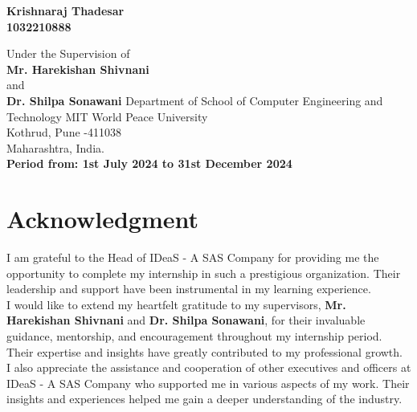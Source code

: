 \documentclass[openany, 11pt]{report} %
\begin{document}
\begin{titlepage}
    \Large{
        \textbf{Krishnaraj Thadesar}\\
        \textbf{1032210888}
    }

    \vspace{0.9\baselineskip} %
    Under the Supervision of\\
    \Large{
        \textbf{Mr. Harekishan Shivnani}\\
        and \\
        \textbf{Dr. Shilpa Sonawani}
    }
    \vfill
    \vspace{0.5\baselineskip} %
    \LARGE{
        Department of School of Computer Engineering and Technology
    }
    \vspace{0.5\baselineskip} %
    \Large {MIT World Peace University\\
        Kothrud, Pune -411038\\
        Maharashtra, India.\\
    }
    \Large{\textbf{Period from: 1st July 2024 to 31st December 2024}}

\end{titlepage}


\tableofcontents
\thispagestyle{empty}
\clearpage

\chapter*{Acknowledgment}
\thispagestyle{empty}
I am grateful to the Head of IDeaS - A SAS Company for providing me the opportunity to complete my internship in such a prestigious organization. Their leadership and support have been instrumental in my learning experience.\\

I would like to extend my heartfelt gratitude to my supervisors, \textbf{Mr. Harekishan Shivnani} and \textbf{Dr. Shilpa Sonawani}, for their invaluable guidance, mentorship, and encouragement throughout my internship period. Their expertise and insights have greatly contributed to my professional growth.\\

I also appreciate the assistance and cooperation of other executives and officers at IDeaS - A SAS Company who supported me in various aspects of my work. Their insights and experiences helped me gain a deeper understanding of the industry.\\
\end{document}
